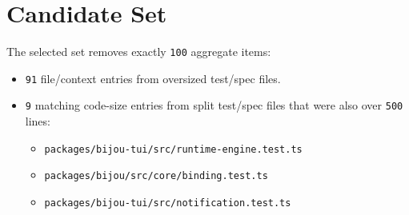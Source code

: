 \section{Candidate Set}\label{record-243-candidate-set}

The selected set removes exactly \texttt{1\allowbreak{}0\allowbreak{}0} aggregate items:

\begin{itemize}
\tightlist
\item
  \texttt{9\allowbreak{}1} file/context entries from oversized test/spec files.
\item
  \texttt{9} matching code-size entries from split test/spec files that were also over \texttt{5\allowbreak{}0\allowbreak{}0} lines:

  \begin{itemize}
  \tightlist
  \item
    \texttt{p\allowbreak{}a\allowbreak{}c\allowbreak{}k\allowbreak{}a\allowbreak{}g\allowbreak{}e\allowbreak{}s\allowbreak{}/\allowbreak{}b\allowbreak{}i\allowbreak{}j\allowbreak{}o\allowbreak{}u\allowbreak{}-\allowbreak{}t\allowbreak{}u\allowbreak{}i\allowbreak{}/\allowbreak{}s\allowbreak{}r\allowbreak{}c\allowbreak{}/\allowbreak{}r\allowbreak{}u\allowbreak{}n\allowbreak{}t\allowbreak{}i\allowbreak{}m\allowbreak{}e\allowbreak{}-\allowbreak{}e\allowbreak{}n\allowbreak{}g\allowbreak{}i\allowbreak{}n\allowbreak{}e\allowbreak{}.\allowbreak{}t\allowbreak{}e\allowbreak{}s\allowbreak{}t\allowbreak{}.\allowbreak{}t\allowbreak{}s}
  \item
    \texttt{p\allowbreak{}a\allowbreak{}c\allowbreak{}k\allowbreak{}a\allowbreak{}g\allowbreak{}e\allowbreak{}s\allowbreak{}/\allowbreak{}b\allowbreak{}i\allowbreak{}j\allowbreak{}o\allowbreak{}u\allowbreak{}/\allowbreak{}s\allowbreak{}r\allowbreak{}c\allowbreak{}/\allowbreak{}c\allowbreak{}o\allowbreak{}r\allowbreak{}e\allowbreak{}/\allowbreak{}b\allowbreak{}i\allowbreak{}n\allowbreak{}d\allowbreak{}i\allowbreak{}n\allowbreak{}g\allowbreak{}.\allowbreak{}t\allowbreak{}e\allowbreak{}s\allowbreak{}t\allowbreak{}.\allowbreak{}t\allowbreak{}s}
  \item
    \texttt{p\allowbreak{}a\allowbreak{}c\allowbreak{}k\allowbreak{}a\allowbreak{}g\allowbreak{}e\allowbreak{}s\allowbreak{}/\allowbreak{}b\allowbreak{}i\allowbreak{}j\allowbreak{}o\allowbreak{}u\allowbreak{}-\allowbreak{}t\allowbreak{}u\allowbreak{}i\allowbreak{}/\allowbreak{}s\allowbreak{}r\allowbreak{}c\allowbreak{}/\allowbreak{}n\allowbreak{}o\allowbreak{}t\allowbreak{}i\allowbreak{}f\allowbreak{}i\allowbreak{}c\allowbreak{}a\allowbreak{}t\allowbreak{}i\allowbreak{}o\allowbreak{}n\allowbreak{}.\allowbreak{}t\allowbreak{}e\allowbreak{}s\allowbreak{}t\allowbreak{}.\allowbreak{}t\allowbreak{}s}

\end{itemize}
\end{itemize}
